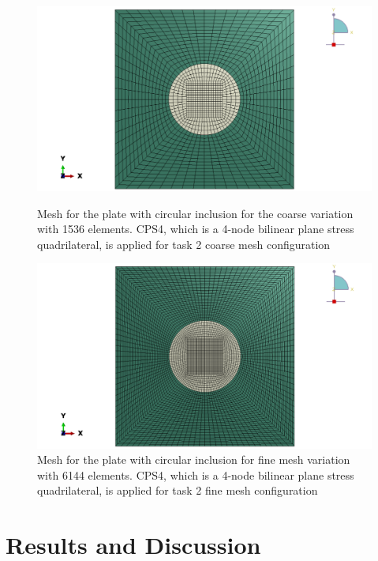 \documentclass[12pt]{article}
\begin{document}
\begin{figure}[H]
    \centering
    \begin{minipage}{0.48\textwidth}
        \centering
        \includegraphics[width=\textwidth]{images/MeshQ2.1.png}
        \caption{Mesh for the plate with circular inclusion for the coarse variation
        with 1536 elements. CPS4, which is a 4-node bilinear plane stress quadrilateral, is applied for task 2 coarse mesh configuration}
        \label{fig:MeshQ2.1}
    \end{minipage}\hfill
    \begin{minipage}{0.48\textwidth}
        \centering
        \includegraphics[width=\textwidth]{images/MeshQ2.2.png}
        \caption{Mesh for the plate with circular inclusion for fine mesh variation
        with 6144 elements. CPS4, which is a 4-node bilinear plane stress quadrilateral, is applied for task 2 fine mesh configuration}
        \label{fig:MeshQ2.2}
    \end{minipage}
\end{figure}
\section*{Results and Discussion}
\end{document}
